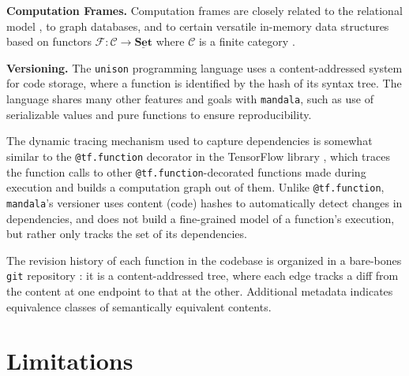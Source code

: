 \documentclass{article} %
\begin{document}
\textbf{Computation Frames.} Computation frames are closely related to the
relational model \citep{codd1970relational}, to graph databases, and to certain
versatile in-memory data structures based on functors
$\mathcal{F}:\mathscr{C}\to \underline{\mathbf{Set}}$ where $\mathscr{C}$ is a
finite category \citep{patterson2022categorical}.

\textbf{Versioning.} The \texttt{unison} programming language
\citep{lozano2017unison} uses a content-addressed system for code storage, where
a function is identified by the hash of its syntax tree. The language shares
many other features and goals with \texttt{mandala}, such as use of serializable
values and pure functions to ensure reproducibility.

The dynamic tracing mechanism used to capture dependencies
is somewhat similar to the \texttt{@tf.function} decorator in the TensorFlow
library \citep{abadi2016tensorflow}, which traces the function calls to other
\texttt{@tf.function}-decorated functions made during execution and builds a
computation graph out of them. Unlike \texttt{@tf.function}, \texttt{mandala}'s
versioner uses content (code) hashes to automatically detect changes in
dependencies, and does not build a fine-grained model of a function's execution, but rather only tracks the set of its dependencies.

The revision history of each function in the codebase is
organized in a bare-bones \texttt{git} repository \citep{git}: it is a
content-addressed tree, where each edge tracks a diff from the content at one
endpoint to that at the other. Additional metadata indicates equivalence classes
of semantically equivalent contents. 

\section{Limitations}
\label{sec:limitations}
\end{document}
